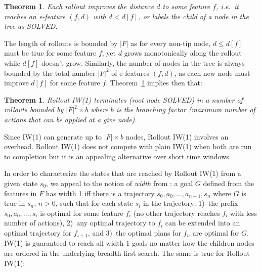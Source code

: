 \documentclass[letterpaper]{article}
\newtheorem{theorem}[definition]{Theorem}
\begin{document}
\begin{theorem}
\label{thm:1}
Each rollout improves the distance $d$ to some feature $f$, i.e.\ it reaches an e-feature $(f,d)$
with $d < d[f]$, or labels the child of a node in the tree as SOLVED.
\end{theorem}


The length of rollouts is bounded by $|F|$ as for every non-tip node, 
$d \leq d[f]$ must be true for some feature $f$, yet $d$ grows monotonically
along the rollout while $d[f]$ doesn't  grow. Similarly, the number of nodes in the tree is always  bounded by the total number
$|F|^2$ of e-features $(f,d)$,  as each new node must improve $d[f]$ for some feature $f$.
Theorem~\ref{thm:1} implies then that:%

\begin{theorem}
Rollout IW(1) terminates (root node SOLVED) in a number of rollouts bounded by
$|F|^2 \times b$ where $b$ is the branching factor (maximum number of
actions that can be applied at a give node).
\end{theorem}

Since IW(1) can generate up to $|F| \times b$ nodes, Rollout IW(1) involves an  overhead. 
Rollout IW(1) does not compete with plain IW(1) when both are run to completion but
it is an appealing alternative over short time windows. 

In order to characterize the states that are reached by Rollout IW(1) from a given state $s_0$,
we appeal to the notion of \emph{width} from \cite{nir:ecai2012}:
a goal $G$ defined from the features in $F$ has width 1 iff
there is a trajectory $s_0,a_0,\ldots,a_{n-1},s_n$ where $G$ is true in $s_n$,   $n > 0$,
such that for each state $s_i$ in the trajectory:
1)~the prefix $s_0,a_0,\ldots,s_i$ is optimal   for some feature $f_i$ (no other trajectory reaches $f_i$ with less number of actions), 
2)~any  optimal trajectory to $f_i$ can be extended into an optimal trajectory for  $f_{i+1}$, 
and 3)~the optimal plans for $f_n$ are optimal for $G$. IW(1) is guaranteed to reach all width 1 goals no matter how the children nodes are ordered
in the underlying breadth-first search. The same is true for Rollout IW(1):
\end{document}
